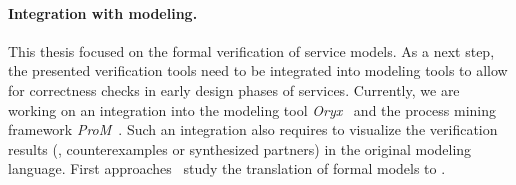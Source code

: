 \paragraph{Integration with modeling.}

This thesis focused on the formal verification of service models. As a next step, the presented verification tools need to be integrated into modeling tools to allow for correctness checks in early design phases of services. Currently, we are working on an integration into the modeling tool \emph{Oryx}~\cite{DeckerOW_2008_bpm} and the process mining framework \emph{ProM}~\cite{AalstDGMMRRSVW_2007_icatpn}. Such an integration also requires to visualize the verification results (\eg, counterexamples or synthesized partners) in the original modeling language. First approaches~\cite{LassenA_2006_otm,AalstL_2008_ist,LohmannK_2008_mod} study the translation of formal models to .
